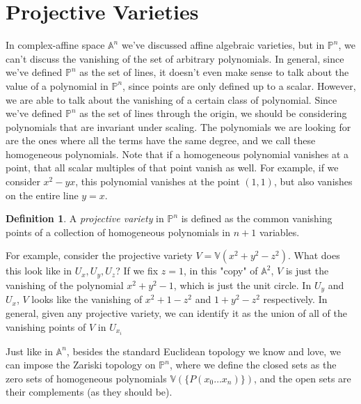 \documentclass[psamsfonts]{amsart}
\theoremstyle{definition}
\newtheorem{defn}[thm]{Definition}
\theoremstyle{remark}
\newcommand{\A}{\mathbb{A}}
\newcommand{\p}{\mathbb{P}}
\newcommand{\V}{\mathbb{V}}
\begin{document}
\section{Projective Varieties}
In complex-affine space $\A^n$ we've discussed affine algebraic varieties, but in $\p^n$, we can't discuss the vanishing of the set of arbitrary polynomials. In general, since we've defined $\p^n$ as the set of lines, it doesn't even make sense to talk about the value of a polynomial in $\p^n$, since points are only defined up to a scalar. However, we are able to talk about the vanishing of a certain class of polynomial. Since we've defined $\p^n$ as the set of lines through the origin, we should be considering polynomials that are invariant under scaling. The polynomials we are looking for are the ones where all the terms have the same degree, and we call these homogeneous polynomials. Note that if a homogeneous polynomial vanishes at a point, that all scalar multiples of that point vanish as well. For example, if we consider $x^2 - yx$, this polynomial vanishes at the point $(1,1)$, but also vanishes on the entire line $y = x$.

\begin{defn}
A \textit{projective variety} in $\p^n$ is defined as the common vanishing points of a collection of homogeneous polynomials in $n+1$ variables.
\end{defn}

For example, consider the projective variety $V = \V(x^2 + y^2 - z^2)$. What does this look like in $U_x,U_y,U_z$? If we fix $z = 1$, in this "copy" of $\A^2$, $V$ is just the vanishing of the polynomial $x^2 + y^2 -1$, which is just the unit circle. In $U_y$ and $U_x$, $V$ looks like the vanishing of $x^2 + 1 - z^2$ and $1 + y^2 - z^2$ respectively. In general, given any projective variety, we can identify it as the union of all of the vanishing points of $V$ in $U_{x_i}$

Just like in $\A^n$, besides the standard Euclidean topology we know and love, we can impose the Zariski topology on $\p^n$, where we define the closed sets as the zero sets of homogeneous polynomials $\V(\{P(x_0 \dots x_n)\})$, and the open sets are their complements (as they should be).\\
\end{document}
